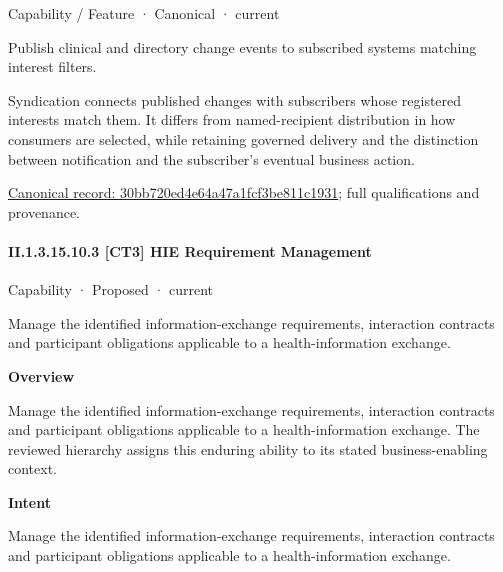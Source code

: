 \label{element:30bb720ed4e64a47a1fcf3be811c1931}
{\small Capability / Feature · Canonical · current}\par

Publish clinical and directory change events to subscribed systems matching interest filters.



Syndication connects published changes with subscribers whose registered interests match them. It differs from named-recipient distribution in how consumers are selected, while retaining governed delivery and the distinction between notification and the subscriber's eventual business action.


{\footnotesize \href{../../../../continuum/strategy/capability/feature/30bb720ed4e64a47a1fcf3be811c1931.md}{Canonical record: 30bb720ed4e64a47a1fcf3be811c1931}; full qualifications and provenance.}\par
\paragraph*{II.1.3.15.10.3 [CT3] HIE Requirement Management}
\label{navigation:II.1.3.15.10.3}

\label{element:1c852a1799984feba50011172983c865}
{\small Capability · Proposed · current}\par

Manage the identified information-exchange requirements, interaction contracts and participant obligations applicable to a health-information exchange.



\textbf{Overview}



Manage the identified information-exchange requirements, interaction contracts and participant obligations applicable to a health-information exchange. The reviewed hierarchy assigns this enduring ability to its stated business-enabling context.



\textbf{Intent}



Manage the identified information-exchange requirements, interaction contracts and participant obligations applicable to a health-information exchange.



